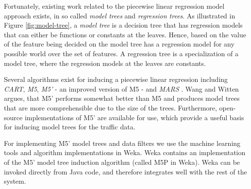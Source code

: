 Fortunately, existing work related to the piecewise linear regression model approach exists, in so called \emph{model trees} and \emph{regression trees}. As illustrated in Figure \ref{fig:model-tree}, a \emph{model tree} is a decision tree that has regression models that can either be functions or constants at the leaves. Hence, based on the value of the feature being decided on the model tree has a regression model for any possible world over the set of features. A regression tree is a specialization of a model tree, where the regression models at the leaves are constants.

Several algorithms exist for inducing a piecewise linear regression including \emph{CART}, \emph{M5}, \emph{M5'} - an improved version of M5 - and \emph{MARS} . Wang and Witten\cite{IMTCC96} argues, that M5' performs somewhat better than M5 and produces model trees that are more comprehensible due to the size of the trees. Furthermore, open-source implementations of M5' are available for use, which provide a useful basis for inducing model trees for the traffic data.

For implementing M5' model trees and data filters we use the machine learning tools and algorithm implementations in Weka\cite{Weka}. Weka contains an implementation of the M5' model tree induction algorithm (called M5P in Weka). Weka can be invoked directly from Java code, and therefore integrates well with the rest of the system.

